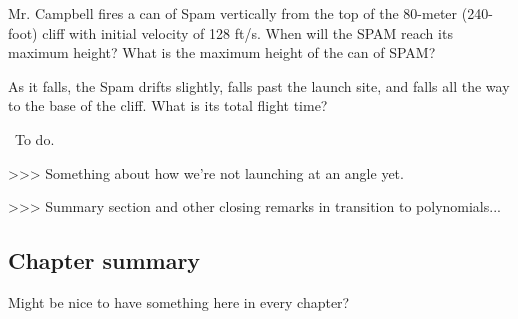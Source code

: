 %
%
%
%
%
%

\begin{boxedex}
Mr. Campbell fires a can of Spam vertically from the top of the 80-meter
(240-foot) cliff with initial velocity of 128 ft/s. When will the SPAM reach its maximum height? What is the maximum height of the can of SPAM?

As it falls, the Spam drifts slightly, falls past the launch site, and falls all the way to the base of the cliff. What is its total flight time?

\exsoln\ To do.
%
%
%
%
%
%
%
%
%
%
%
%
%
\end{boxedex}

>>> Something about how we're not launching at an angle yet.

>>> Summary section and other closing remarks in transition to polynomials...

\subsection*{Chapter summary}

Might be nice to have something here in every chapter?

